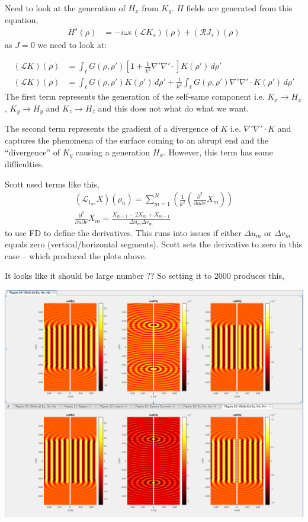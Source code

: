 \documentclass{article}
\newcommand{\0}{\varnothing}
\begin{document}
\noindent Need to look at the generation of $H_x$ from $K_y$. $H$ fields are generated from this equation,
\begin{align*}
    H^s(\rho) &= -i\omega\epsilon(\mathcal{L}K_s)(\rho) + (\mathcal{R}J_s)(\rho)
\end{align*}
as $J = 0$ we need to look at:

\begin{align*}
    (\mathcal{L}K)(\rho) &= \int_{\ell}G(\rho,\rho')[1+\frac{1}{k^2}\nabla'\nabla'\cdotp]K(\rho') \,d\rho'\\
    (\mathcal{L}K)(\rho) &= \int_{\ell}G(\rho,\rho') K(\rho') \,d\rho' + \frac{1}{k^2} \int_{\ell} G(\rho,\rho') \nabla'\nabla'\cdotp K(\rho') \,d\rho'
\end{align*}
The first term represents the generation of the self-same component i.e. $K_x \rightarrow H_x$, $K_y \rightarrow H_y$ and $K_z \rightarrow H_z$ and this does not what do what we want.

The second term represents the gradient of a divergence of $K$ i.e. $\nabla'\nabla'\cdotp K$ and captures the phenomena of the surface coming to an abrupt end and the ``divergence'' of $K_y$ causing a generation $H_x$. However, this term has some difficulties.

Scott used terms like this,
\begin{align*}
    (\mathcal{L}_{1_{uv}}X)(\rho_n) = \sum_{m=1}^{N} \left(\frac{1}{k^2}\left(
    \frac{\partial^2}{\partial u \partial v}X_{m}
    \right)\right)\\
        \frac{\partial^2}{\partial u \partial v}X_m = \frac{X_{m+1} - 2X_{m} + X_{m-1}}{\Delta u_m \Delta v_m}
\end{align*}
to use FD to define the derivatives. This runs into issues if either $\Delta u_m$ or $\Delta v_m$ equals zero (vertical/horizontal segments). Scott sets the derivative to zero in this case -- which produced the plots above. 

\newpage
It looks like it should be large number ?? So setting it to 2000 produces this,

\begin{center}
\includegraphics[width=0.55\columnwidth]{figures/Fields2000}
\end{center}
\end{document}
